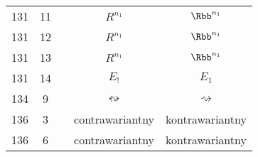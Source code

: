 \documentclass[a4paper,11pt]{article}
\numberwithin{equation}{section}
\begin{document}
\begin{center}
\begin{tabular}{|c|c|c|c|c|}
    131 & 11 & & $R^{ n_{ 1 } }$ & $\Rbb^{ n_{ 1 } }$ \\
    131 & 12 & & $R^{ n_{ 1 } }$ & $\Rbb^{ n_{ 1 } }$ \\
    131 & 13 & & $R^{ n_{ 1 } }$ & $\Rbb^{ n_{ 1 } }$ \\
    131 & 14 & & $E_{ ! }$ & $E_{ 1 }$ \\
    134 & \hphantom{0}9 & & $\leftrightsquigarrow$ & $\rightsquigarrow$ \\
    136 & \hphantom{0}3 & & contrawariantny & kontrawariantny \\
    136 & \hphantom{0}6 & & contrawariantny & kontrawariantny \\
    \hline
  \end{tabular}





  \newpage


\end{center}
\end{document}
